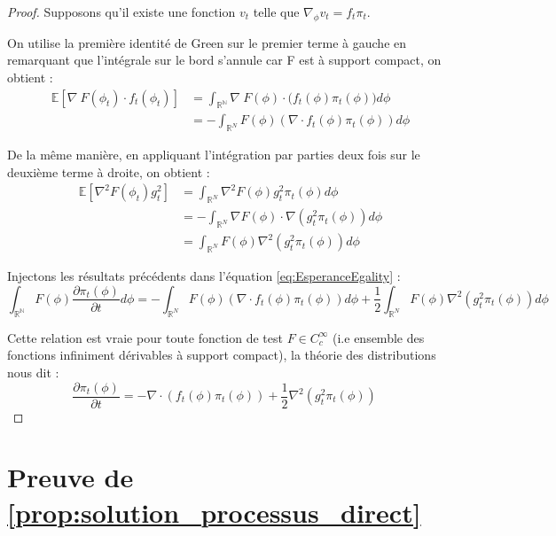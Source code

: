 \documentclass[a4paper,10pt]{article}
\theoremstyle{definition} %
\theoremstyle{definition} %
\theoremstyle{definition} %
\theoremstyle{definition} %
\newcommand{\E}[1]{\mathbb{E}\left[#1\right]}
\newcommand{\R}{\mathbb{R}}
\begin{document}
\begin{proof}
Supposons qu'il existe une fonction $v_t$ telle que $\nabla_{\phi} v_t = f_t \pi_t$.

On utilise la première identité de Green sur le premier terme à gauche en remarquant que l'intégrale sur le bord s'annule car F est à support compact, on obtient :
\begin{align*}
    \E{\nabla\ F(\phi_t)\cdot f_t(\phi_t)}  &=\int_{\mathbb{R^N}} \nabla\ F(\phi)\cdot \big(f_t(\phi) \pi_t(\phi) \bigr)d\phi \\
    &= - \int_{\mathbb{R}^N}F(\phi) (\nabla \cdot f_t(\phi)\pi_t(\phi))d\phi
\end{align*}

De la même manière, en appliquant l'intégration par parties deux fois sur le deuxième terme à droite, on obtient :
\begin{align*}
    \E{\nabla^2 F(\phi_t) g_t^2} &= \int_{\mathbb{R}^N } \nabla^2 F(\phi) g_t^2 \pi_t(\phi)d\phi\\
    &= -\int_{\R^N}\nabla F(\phi) \cdot\nabla(g_t^2\pi_t(\phi)) d\phi\\
    &= \int_{\mathbb{R}^N } F(\phi) \nabla^2(g_t^2 \pi_t(\phi)) d\phi
\end{align*}

Injectons les résultats précédents dans l'équation \eqref{eq:EsperanceEgality} :
\[\int_{\mathbb{R^N}}F(\phi)\frac{\partial\pi_t(\phi)}{\partial t} d\phi = - \int_{\mathbb{R}^N}F(\phi) (\nabla \cdot f_t(\phi)\pi_t(\phi))d\phi + \frac{1}{2}\int_{\mathbb{R}^N } F(\phi) \nabla^2(g_t^2 \pi_t(\phi)) d\phi\]

Cette relation est vraie pour toute fonction de test $F \in C_c^{\infty}$ (i.e ensemble des fonctions infiniment dérivables à support compact), la théorie des distributions nous dit : 
\[\frac{\partial\pi_t(\phi)}{\partial t} = -\nabla \cdot (f_t(\phi)\pi_t(\phi)) + \frac{1}{2}\nabla^2(g_t^2 \pi_t(\phi)) \quad \] 
\end{proof}

\section{Preuve de \cref{prop:solution_processus_direct}} \label{sec:proof_solution_processus_direct}
\end{document}

